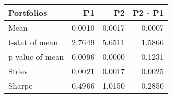 \begin{tabular}{lrrr}
\toprule
Portfolios & P1 & P2 & P2 - P1 \\
\midrule
Mean & 0.0010 & 0.0017 & 0.0007 \\
t-stat of mean & 2.7649 & 5.6511 & 1.5866 \\
p-value of mean & 0.0096 & 0.0000 & 0.1231 \\
Stdev & 0.0021 & 0.0017 & 0.0025 \\
Sharpe & 0.4966 & 1.0150 & 0.2850 \\
\bottomrule
\end{tabular}
